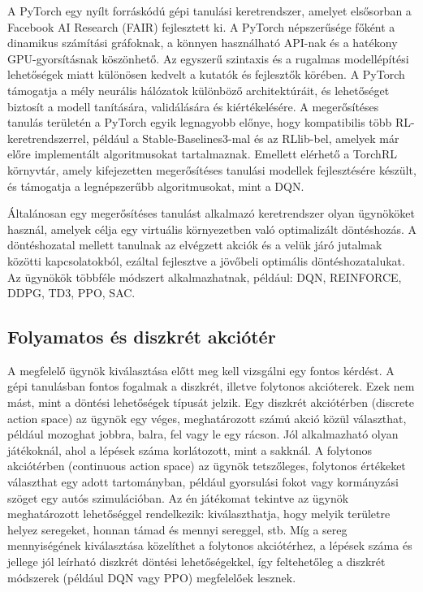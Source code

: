 \documentclass[
]{thesis-ekf}
\theoremstyle{definition}
\theoremstyle{remark}
\begin{document}
A PyTorch egy nyílt forráskódú gépi tanulási keretrendszer, amelyet elsősorban a Facebook AI Research (FAIR) fejlesztett ki. A PyTorch népszerűsége főként a dinamikus számítási gráfoknak, a könnyen használható API-nak és a hatékony GPU-gyorsításnak köszönhető. Az egyszerű szintaxis és a rugalmas modellépítési lehetőségek miatt különösen kedvelt a kutatók és fejlesztők körében. A PyTorch támogatja a mély neurális hálózatok különböző architektúráit, és lehetőséget biztosít a modell tanítására, validálására és kiértékelésére. A megerősítéses tanulás területén a PyTorch egyik legnagyobb előnye, hogy kompatibilis több RL-keretrendszerrel, például a Stable-Baselines3-mal és az RLlib-bel, amelyek már előre implementált algoritmusokat tartalmaznak. Emellett elérhető a TorchRL környvtár, amely kifejezetten megerősítéses tanulási modellek fejlesztésére készült, és támogatja a legnépszerűbb algoritmusokat, mint a DQN. \cite{PYTCH}

Általánosan egy megerősítéses tanulást alkalmazó keretrendszer olyan ügynököket használ, amelyek célja egy virtuális környezetben való optimalizált döntéshozás. A döntéshozatal mellett tanulnak az elvégzett akciók és a velük járó jutalmak közötti kapcsolatokból, ezáltal fejlesztve a jövőbeli optimális döntéshozatalukat. Az ügynökök többféle módszert alkalmazhatnak, például: DQN, REINFORCE, DDPG, TD3, PPO, SAC.

\subsection{Folyamatos és diszkrét akciótér}

A megfelelő ügynök kiválasztása előtt meg kell vizsgálni egy fontos kérdést. A gépi tanulásban fontos fogalmak a diszkrét, illetve folytonos akcióterek. \cite{ActSpac} Ezek nem mást, mint a döntési lehetőségek típusát jelzik. Egy diszkrét akciótérben (discrete action space) az ügynök egy véges, meghatározott számú akció közül választhat, például mozoghat jobbra, balra, fel vagy le egy rácson. Jól alkalmazható olyan játékoknál, ahol a lépések száma korlátozott, mint a sakknál. A folytonos akciótérben (continuous action space) az ügynök tetszőleges, folytonos értékeket választhat egy adott tartományban, például gyorsulási fokot vagy kormányzási szöget egy autós szimulációban. Az én játékomat tekintve az ügynök meghatározott lehetőséggel rendelkezik: kiválaszthatja, hogy melyik területre helyez seregeket, honnan támad és mennyi sereggel, stb. Míg a sereg mennyiségének kiválasztása közelíthet a folytonos akciótérhez, a lépések száma és jellege jól leírható diszkrét döntési lehetőségekkel, így feltehetőleg a diszkrét módszerek (például DQN vagy PPO) megfelelőek lesznek.
\end{document}
